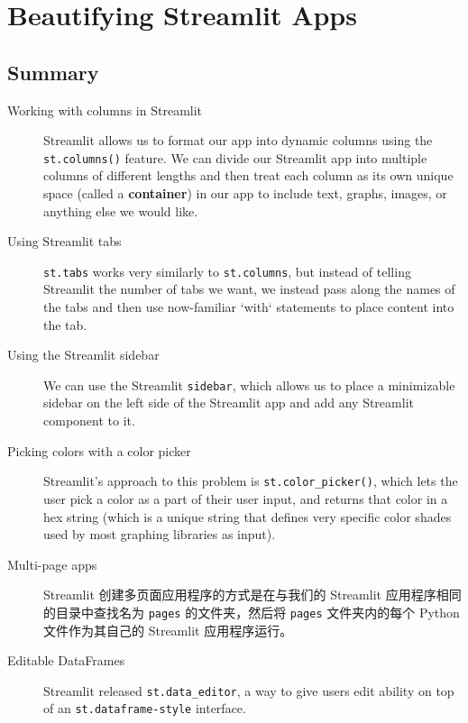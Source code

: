 \chapter{Beautifying Streamlit Apps\label{ch06}}
\section{Summary}
\begin{description}
    \item[Working with columns in Streamlit]Streamlit allows us to format our app into dynamic columns using the \verb|st.columns()| feature. We can divide our Streamlit app into multiple columns of different lengths and then treat each column as its own unique space (called a \textbf{container}) in our app to include text, graphs, images, or anything else we would like.
    \item[Using Streamlit tabs]\verb|st.tabs| works very similarly to \verb|st.columns|, but instead of telling Streamlit the number of tabs we want, we instead pass along the names of the tabs and then use now-familiar `with` statements to place content into the tab.
    \item[Using the Streamlit sidebar]We can use the Streamlit \verb|sidebar|, which allows us to place a minimizable sidebar on the left side of the Streamlit app and add any Streamlit component to it.
    \item[Picking colors with a color picker]Streamlit's approach to this problem is \verb|st.color_picker()|, which lets the user pick a color as a part of their user input, and returns that color in a hex string (which is a unique string that defines very specific color shades used by most graphing libraries as input).
    \item[Multi-page apps]Streamlit 创建多页面应用程序的方式是在与我们的 Streamlit 应用程序相同的目录中查找名为 \verb|pages| 的文件夹，然后将 \verb|pages| 文件夹内的每个 Python 文件作为其自己的 Streamlit 应用程序运行。
    \item[Editable DataFrames]Streamlit released \verb|st.data_editor|, a way to give users edit ability on top of an \verb|st.dataframe-style| interface.
\end{description}